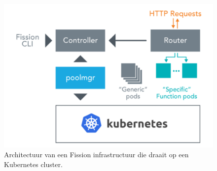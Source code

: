 \begin{figure}
    \includegraphics[width=1\textwidth]{img/fission_architectuur.png}
    \caption{Architectuur van een Fission infrastructuur die draait op een Kubernetes cluster. \autocite{Chemitiganti2018}}
    \label{fig:fission-architectuur}
\end{figure}

